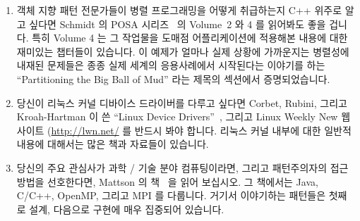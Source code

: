 \begin{enumerate}
\item	객체 지향 패턴 전문가들이 병렬 프로그래밍을 어떻게 취급하는지 C++
	위주로 알고 싶다면 Schmidt 의 POSA
	시리즈~\cite{SchmidtStalRohnertBuschmann2000v2Textbook,
	BuschmannHenneySchmidt2007v4Textbook} 의 Volume~2 와 4 를 읽어봐도 좋을
	겁니다.  특히 Volume 4 는 그 작업물을 도매점 어플리케이션에 적용해본
	내용에 대한 재미있는 챕터들이 있습니다.  이 예제가 얼마나 실제 상황에
	가까운지는 병렬성에 내재된 문제들은 종종 실제 세계의 응용사례에서
	시작된다는 이야기를 하는 ``Partitioning the Big Ball of Mud'' 라는
	제목의 섹션에서 증명되었습니다.

\iffalse
\item	If you are interested in an object-oriented patternist
	treatment of parallel programming focussing on C++,
	you might try Volumes~2 and 4 of Schmidt's POSA
	series~\cite{SchmidtStalRohnertBuschmann2000v2Textbook,
	BuschmannHenneySchmidt2007v4Textbook}.
	Volume 4 in particular has some interesting chapters
	applying this work to a warehouse application.
	The realism of this example is attested to by
	the section entitled ``Partitioning the Big Ball of Mud'',
	wherein the problems inherent in parallelism often
	take a back seat to the problems inherent in getting
	one's head around a real-world application.
\fi

\item	당신이 리눅스 커널 디바이스 드라이버를 다루고 싶다면 Corbet, Rubini,
	그리고 Kroah-Hartman 이 쓴 ``Linux Device
	Drivers''~\cite{CorbetRubiniKroahHartman}, 그리고 Linux Weekly New
	웹사이트 (\url{http://lwn.net/} 를 반드시 봐야 합니다.
	리눅스 커널 내부에 대한 일반적 내용에 대해서는 많은 책과 자료들이
	있습니다.

\iffalse
\item	If you want to work with Linux-kernel device drivers,
	then Corbet's, Rubini's, and Kroah-Hartman's
	``Linux Device Drivers''~\cite{CorbetRubiniKroahHartman}
	is indespensible, as is the Linux Weekly News web site
	(\url{http://lwn.net/}.
	There is a large number of books and resources on
	the more general topic of Linux kernel internals.
\fi

\item	당신의 주요 관심사가 과학 / 기술 분야 컴퓨팅이라면, 그리고 패턴주의자의
	접근방법을 선호한다면, Mattson 의 책~\cite{Mattson2005Textbook} 을 읽어
	보십시오.
	그 책에서는 Java, C/C++, OpenMP, 그리고 MPI 를 다룹니다.
	거기서 이야기하는 패턴들은 첫째로 설계, 다음으로 구현에 매우 집중되어
	있습니다.

\iffalse
\item	If your primary focus is scientific and technical computing,
	and you prefer a patternist approach,
	you might try Mattson et al.'s
	textbook~\cite{Mattson2005Textbook}.
	It covers Java, C/C++, OpenMP, and MPI.
	Its patterns are admirably focused first on design,
	then on implementation.
\fi


\end{enumerate}
